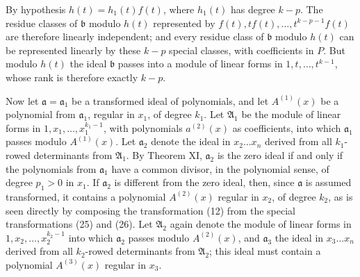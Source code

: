 \documentclass[11pt]{article}
\providecommand{\aideal}{\mathfrak a}
\providecommand{\bideal}{\mathfrak b}
\begin{document}
By hypothesis $h(t)=h_1(t)f(t)$, where $h_1(t)$ has degree $k-p$. The residue classes of $\bideal$ modulo $h(t)$ represented by $f(t),tf(t),\ldots,t^{k-p-1}f(t)$ are therefore linearly independent; and every residue class of $\bideal$ modulo $h(t)$ can be represented linearly by these $k-p$ special classes, with coefficients in $P$. But modulo $h(t)$ the ideal $\bideal$ passes into a module of linear forms in $1,t,
\ldots,t^{k-1}$, whose rank is therefore exactly $k-p$.

Now let $\aideal=\aideal_1$ be a transformed ideal of polynomials, and let $A^{(1)}(x)$ be a polynomial from $\aideal_1$, regular in $x_1$, of degree $k_1$. Let $\mathfrak A_1$ be the module of linear forms in $1,x_1,
\ldots,x_1^{k_1-1}$, with polynomials $a^{(2)}(x)$ as coefficients, into which $\aideal_1$ passes modulo $A^{(1)}(x)$. Let $\aideal_2$ denote the ideal in $x_2\ldots x_n$ derived from all $k_1$-rowed determinants from $\mathfrak A_1$. By Theorem XI, $\aideal_2$ is the zero ideal if and only if the polynomials from $\aideal_1$ have a common divisor, in the polynomial sense, of degree $p_1>0$ in $x_1$. If $\aideal_2$ is different from the zero ideal, then, since $\aideal$ is assumed transformed, it contains a polynomial $A^{(2)}(x)$ regular in $x_2$, of degree $k_2$, as is seen directly by composing the transformation (12) from the special transformations (25) and (26). Let $\mathfrak A_2$ again denote the module of linear forms in $1,x_2,
\ldots,x_2^{k_2-1}$ into which $\aideal_2$ passes modulo $A^{(2)}(x)$, and $\aideal_3$ the ideal in $x_3\ldots x_n$ derived from all $k_2$-rowed determinants from $\mathfrak A_2$; this ideal must contain a polynomial $A^{(3)}(x)$ regular in $x_3$.
\end{document}
